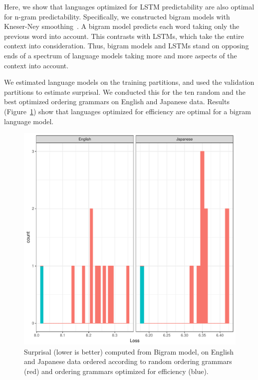 \documentclass[10pt,twoside,lineno]{article}
\begin{document}
Here, we show that languages optimized for LSTM predictability are also optimal for n-gram predictability.
Specifically, we constructed bigram models with Kneser-Ney smoothing~\cite{kneser1995improved, chen1999empirical}.
A bigram model predicts each word taking only the previous word into account.
This contrasts with LSTMs, which take the entire context into consideration.
Thus, bigram models and LSTMs stand on opposing ends of a spectrum of language models taking more and more aspects of the context into account.

We estimated language models on the training partitions, and used the validation partitions to estimate surprisal.
We conducted this for the ten random and the best optimized ordering grammars on English and Japanese data.
Results (Figure~\ref{fig:bigrams}) show that languages optimized for efficiency are optimal for a bigram language model.

\begin{figure}
    \centering
    \includegraphics[scale=.4]{../results/bigrams/bigrams.pdf} 
	\caption{Surprisal (lower is better) computed from Bigram model, on English and Japanese data ordered according to random ordering grammars (red) and ordering grammars optimized for efficiency (blue).}
    \label{fig:bigrams}
\end{figure}
\end{document}
